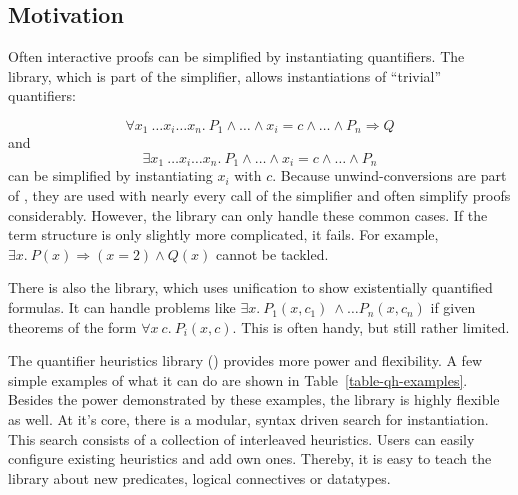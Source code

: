 
\setcounter{sessioncount}{0}

\subsection{Motivation}

Often interactive proofs can be simplified by instantiating
quantifiers. The  library, which is part of the simplifier, allows
instantiations of ``trivial'' quantifiers:

\[ \forall x_1\ \ldots x_i \ldots x_n.\ P_1 \wedge \ldots \wedge x_i = c \wedge \ldots \wedge P_n \Longrightarrow Q \]
and
\[ \exists x_1\ \ldots x_i \ldots x_n.\ P_1 \wedge \ldots \wedge x_i =
c \wedge \ldots \wedge P_n \] can be simplified by
instantiating $x_i$ with $c$. Because unwind-conversions are
part of , they are used with nearly every call of the simplifier
and often simplify proofs considerably. However, the  library can only handle these common cases. If the term structure is
only slightly more complicated, it fails. For example, $\exists x.\ P(x) \Longrightarrow (x = 2) \wedge Q(x)$
cannot be tackled.

There is also the  library, which uses
unification to show existentially quantified formulas. It can handle
problems like $\exists x.\ P_1(x,c_1)\ \wedge \ldots P_n(x,c_n)$ if
given theorems of the form $\forall x\ c.\ P_i(x, c)$. This is often
handy, but still rather limited.

The quantifier heuristics library () provides more power
and flexibility. A few simple examples of what it can do
are shown in Table~\ref{table-qh-examples}. Besides the power demonstrated
by these examples, the library is highly flexible as well.  At it's
core, there is a modular, syntax driven search for instantiation.
This search consists of a collection of interleaved heuristics.  Users
can easily configure existing heuristics and add own ones. Thereby, it
is easy to teach the library about new predicates, logical connectives
or datatypes.

